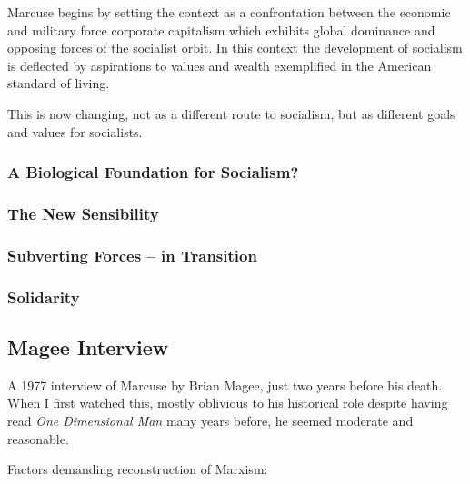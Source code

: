 \documentclass[10pt,titlepage]{book}
\begin{document}
Marcuse begins by setting the context as a confrontation between the economic and military force corporate capitalism which exhibits global dominance and opposing forces of the socialist orbit.
In this context the development of socialism is deflected by aspirations to values and wealth exemplified in the American standard of living.

This is now changing, not as a different route to socialism, but as different goals and values for socialists.


\subsubsection{A Biological Foundation for Socialism?}
\subsubsection{The New Sensibility}
\subsubsection{Subverting Forces – in Transition}
\subsubsection{Solidarity}

\subsection{Magee Interview \cite{marcuse-magee}}

A 1977 interview of Marcuse by Brian Magee, just two years before his death.
When I first watched this, mostly oblivious to his historical role despite having read \emph{One Dimensional Man} many years before, he seemed moderate and reasonable.

Factors demanding reconstruction of Marxism:
\end{document}
